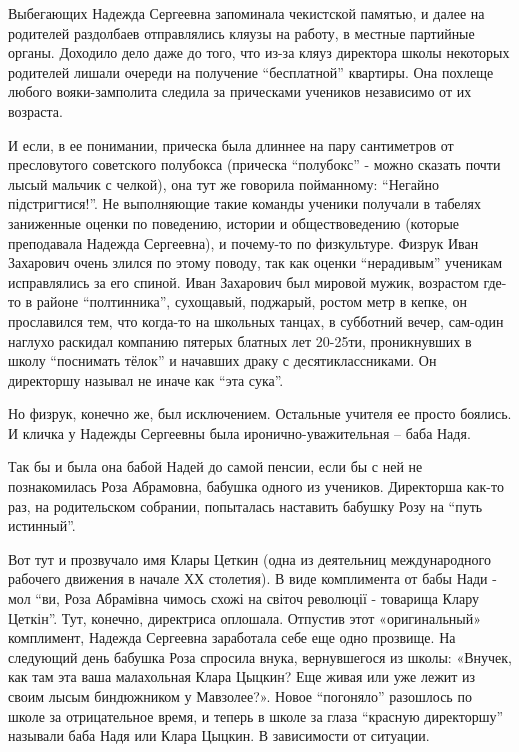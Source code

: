Выбегающих Надежда Сергеевна запоминала
чекистской памятью, и далее на родителей раздолбаев отправлялись кляузы на
работу, в местные партийные органы. Доходило дело даже до того, что из-за кляуз
директора школы некоторых родителей лишали очереди на получение \enquote{бесплатной}
квартиры. Она похлеще любого вояки-замполита следила за прическами учеников
независимо от их возраста. 

И если, в ее понимании, прическа была длиннее на пару сантиметров от
пресловутого советского полубокса (прическа \enquote{полубокс} - можно сказать
почти лысый мальчик с челкой), она тут же говорила пойманному: \enquote{Негайно
підстригтися!}. Не выполняющие такие команды ученики получали в табелях
заниженные оценки по поведению, истории и обществоведению (которые преподавала
Надежда Сергеевна), и почему-то по физкультуре. Физрук Иван Захарович очень
злился по этому поводу, так как оценки \enquote{нерадивым} ученикам
исправлялись за его спиной. Иван Захарович  был мировой мужик, возрастом где-то
в районе \enquote{полтинника}, сухощавый, поджарый, ростом метр в кепке, он
прославился тем, что когда-то на школьных танцах, в субботний вечер, сам-один
наглухо раскидал компанию пятерых блатных лет 20-25ти, проникнувших в школу
\enquote{поснимать тёлок} и начавших драку с десятиклассниками. Он директоршу
называл не иначе как \enquote{эта сука}. 

Но физрук, конечно же, был исключением. Остальные учителя ее просто боялись. И
кличка у Надежды Сергеевны была иронично-уважительная – баба Надя.

Так бы и была она бабой Надей до самой пенсии, если бы с ней не познакомилась
Роза Абрамовна, бабушка одного из учеников. Директорша как-то раз, на
родительском собрании, попыталась наставить бабушку Розу на \enquote{путь
истинный}.

Вот тут и прозвучало имя Клары Цеткин (одна из деятельниц международного
рабочего движения в начале ХХ столетия). В виде комплимента от бабы Нади - мол
\enquote{ви, Роза Абрамівна чимось схожі на світоч революції - товарища Клару
Цеткін}.  Тут, конечно, директриса оплошала. Отпустив этот «оригинальный»
комплимент, Надежда Сергеевна заработала себе еще одно прозвище. На следующий
день бабушка Роза спросила внука, вернувшегося из школы: «Внучек, как там эта
ваша малахольная Клара Цыцкин? Еще живая или уже лежит из своим лысым
биндюжником у Мавзолее?». Новое \enquote{погоняло} разошлось по школе за
отрицательное время, и теперь в школе за глаза \enquote{красную директоршу}
называли баба Надя или Клара Цыцкин. В зависимости от ситуации.


